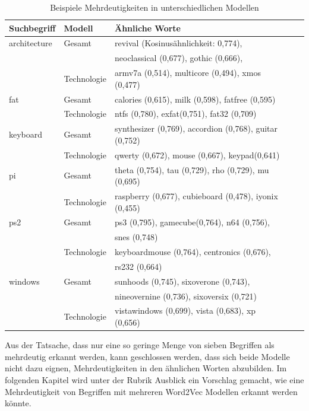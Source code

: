 \documentclass[12pt,a4paper]{report}
\begin{document}
		\begin{table}[H]
\caption{Beispiele Mehrdeutigkeiten in unterschiedlichen Modellen}
\label{tab:bspJeEinModellMehrdeutig}
\begin{center}
\begin{tabular}{|l||l|l|l|l|}
\hline
\textbf{Suchbegriff} & \textbf{Modell} & \textbf{Ähnliche Worte}   \\
\hline

 
architecture & Gesamt		&  revival (Kosinusähnlichkeit: 0,774),  \\
&				&  neoclassical (0,677), gothic (0,666),  \\
&Technologie 	&  armv7a (0,514), multicore (0,494), xmos (0,477)\\
\hline
fat & Gesamt		&  calories (0,615), milk (0,598), fatfree (0,595) \\
&Technologie 	&  ntfs (0,780), exfat(0,751), fat32 (0,709) \\
\hline
 keyboard & Gesamt		&  synthesizer (0,769), accordion (0,768), guitar (0,752)\\
&Technologie 	&  qwerty (0,672), mouse (0,667), keypad(0,641)\\
\hline
pi  & Gesamt	 &  theta (0,754), tau (0,729), rho (0,729), mu (0,695)\\
 &  Technologie  &  raspberry (0,677), cubieboard (0,478), iyonix (0,455)\\
 \hline
 ps2 & Gesamt		&  ps3 (0,795), gamecube(0,764), n64 (0,756), \\
 &&snes (0,748)\\

&Technologie 	&  keyboardmouse (0,764), centronics (0,676),\\
&& rs232 (0,664)\\
\hline
 windows & Gesamt		&  sunhoods (0,745), sixoverone (0,743), \\
&				&  nineovernine (0,736), sixoversix (0,721)  \\
&Technologie 	&  vistawindows (0,699), vista (0,683), xp (0,656)\\
\hline
\end{tabular}
\end{center}
\end{table}
		

				
		Aus der Tatsache, dass nur eine so geringe Menge von sieben Begriffen als mehrdeutig erkannt werden, kann geschlossen werden, dass sich beide Modelle nicht dazu eignen, Mehrdeutigkeiten in den ähnlichen Worten abzubilden. Im folgenden Kapitel wird unter der Rubrik Ausblick ein Vorschlag gemacht, wie eine Mehrdeutigkeit von Begriffen mit mehreren Word2Vec Modellen erkannt werden könnte.
		
\end{document}

